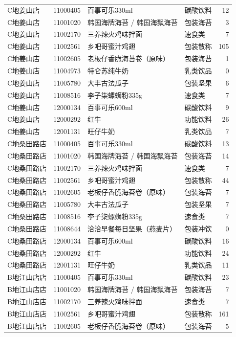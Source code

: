 \begin{longtable}{p{2.4cm}p{1.9cm}p{4.4cm}p{1.8cm}r}
C地姜山店 & 11000405 & 百事可乐330ml & 碳酸饮料 & 12 \\
C地姜山店 & 11001020 & 韩国海牌海苔 / 韩国海飘海苔 & 包装海苔 & 3 \\
C地姜山店 & 11002170 & 三养辣火鸡味拌面 & 速食类 & 7 \\
C地姜山店 & 11002561 & 乡吧哥蜜汁鸡翅 & 包装散称 & 105 \\
C地姜山店 & 11002605 & 老板仔香脆海苔卷（原味） & 包装海苔 & 1 \\
C地姜山店 & 11004973 & 特仑苏纯牛奶 & 乳类饮品 & 0 \\
C地姜山店 & 11005780 & 大丰古法瓜子 & 包装坚果 & 6 \\
C地姜山店 & 11008516 & 李子柒螺蛳粉335g & 速食类 & 7 \\
C地姜山店 & 12000134 & 百事可乐600ml & 碳酸饮料 & 9 \\
C地姜山店 & 12000292 & 红牛 & 功能饮料 & 26 \\
C地姜山店 & 12001131 & 旺仔牛奶 & 乳类饮品 & 7 \\
C地桑田路店 & 11000405 & 百事可乐330ml & 碳酸饮料 & 13 \\
C地桑田路店 & 11001020 & 韩国海牌海苔 / 韩国海飘海苔 & 包装海苔 & 14 \\
C地桑田路店 & 11002170 & 三养辣火鸡味拌面 & 速食类 & 7 \\
C地桑田路店 & 11002561 & 乡吧哥蜜汁鸡翅 & 包装散称 & 44 \\
C地桑田路店 & 11002605 & 老板仔香脆海苔卷（原味） & 包装海苔 & 7 \\
C地桑田路店 & 11005780 & 大丰古法瓜子 & 包装坚果 & 7 \\
C地桑田路店 & 11008516 & 李子柒螺蛳粉335g & 速食类 & 7 \\
C地桑田路店 & 11008644 & 洽洽早餐每日坚果（燕麦片） & 包装冲饮 & 0 \\
C地桑田路店 & 12000134 & 百事可乐600ml & 碳酸饮料 & 16 \\
C地桑田路店 & 12000292 & 红牛 & 功能饮料 & 24 \\
C地桑田路店 & 12001131 & 旺仔牛奶 & 乳类饮品 & 11 \\
B地江山店店 & 11000405 & 百事可乐330ml & 碳酸饮料 & 23 \\
B地江山店店 & 11001020 & 韩国海牌海苔 / 韩国海飘海苔 & 包装海苔 & 7 \\
B地江山店店 & 11002170 & 三养辣火鸡味拌面 & 速食类 & 7 \\
B地江山店店 & 11002561 & 乡吧哥蜜汁鸡翅 & 包装散称 & 161 \\
B地江山店店 & 11002605 & 老板仔香脆海苔卷（原味） & 包装海苔 & 5 \\

\end{longtable}
